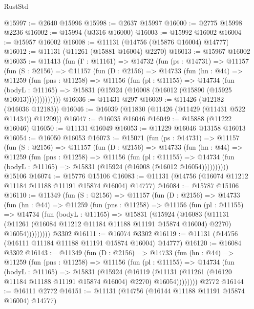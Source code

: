 \begin{lexlean}{RustStd}
\begin{coremodule}
@15997 := @2640 @15996
@15998 := @2637 @15997
@16000 := @2775 @15998 @2236
@16002 := @15994 (@3316 @16000)
@16003 := @15992 @16002
@16004 := @15957 @16002
@16008 := @11131 (@14756 (@15876 @16004) @14777)
@16012 := @11131 (@11261 (@15881 @16004) @2270)
@16013 := @15967 @16002
@16035 := @11413
    (fun (Γ : @11161) =>
    @14732
      (fun (ps : @14731) =>
      @11157
        (fun (S : @2156) =>
        @11157
          (fun (D : @2156) =>
          @14733
            (fun (hn : @44) =>
            @11259
              (fun (pns : @11258) =>
              @11156
                (fun (pl : @11155) =>
                @14734
                  (fun (bodyL : @11165) =>
                  @15831 (@15924 (@16008 (@16012 (@15890 (@15925 @16013)))))))))))))
@16036 := @11431 @297
@16039 := @11426 (@12182 (@16036 @12183))
@16046 := @16039 (@11830 (@11426 (@11429 (@11431 @522 @11434)) @11209))
@16047 := @16035 @16046
@16049 := @15888 (@11222 @16046)
@16050 := @11131 @16049
@16053 := @11229 @16046 @13158 @16013
@16054 := @16050 @16053
@16073 := @15071
    (fun (ps : @14731) =>
    @11157
      (fun (S : @2156) =>
      @11157
        (fun (D : @2156) =>
        @14733
          (fun (hn : @44) =>
          @11259
            (fun (pns : @11258) =>
            @11156
              (fun (pl : @11155) =>
              @14734 (fun (bodyL : @11165) => @15831 (@15924 (@16008 (@16012 @16054))))))))))
    @15106
@16074 := @15776 @15106
@16083 := @11131 (@14756 (@16074 @11212 @11184 @11188 @11191 @15874 @16004) @14777)
@16084 := @15787 @15106
@16110 := @11349
    (fun (S : @2156) =>
    @11157
      (fun (D : @2156) =>
      @14733
        (fun (hn : @44) =>
        @11259
          (fun (pns : @11258) =>
          @11156
            (fun (pl : @11155) =>
            @14734
              (fun (bodyL : @11165) =>
              @15831
                (@15924
                  (@16083
                    (@11131
                      (@11261 (@16084 @11212 @11184 @11188 @11191 @15874 @16004) @2270)
                      @16054)))))))))
    @3302
@16111 := @16074 @3302
@16119 := @11131 (@14756 (@16111 @11184 @11188 @11191 @15874 @16004) @14777)
@16120 := @16084 @3302
@16143 := @11349
    (fun (D : @2156) =>
    @14733
      (fun (hn : @44) =>
      @11259
        (fun (pns : @11258) =>
        @11156
          (fun (pl : @11155) =>
          @14734
            (fun (bodyL : @11165) =>
            @15831
              (@15924
                (@16119
                  (@11131 (@11261 (@16120 @11184 @11188 @11191 @15874 @16004) @2270) @16054))))))))
    @2772
@16144 := @16111 @2772
@16151 := @11131 (@14756 (@16144 @11188 @11191 @15874 @16004) @14777)

\end{coremodule}
\end{lexlean}

